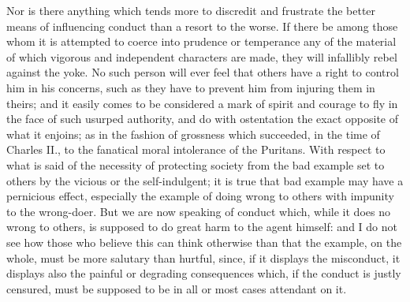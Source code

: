 \documentclass[11pt,openany]{book}
\begin{document}
Nor is there anything which tends more to discredit and frustrate the better means of influencing conduct than a resort to the worse. If there be among those whom it is attempted to coerce into prudence or temperance any of the material of which vigorous and independent characters are made, they will infallibly rebel against the yoke. No such person will ever feel that others have a right to control him in his concerns, such as they have to prevent him from injuring them in theirs; and it easily comes to be considered a mark of spirit and courage to fly in the face of such usurped authority, and do with ostentation the exact opposite of what it enjoins; as in the fashion of grossness which succeeded, in the time of Charles II., to the fanatical moral intolerance of the Puritans. With respect to what is said of the necessity of protecting society from the bad example set to others by the vicious or the self-indulgent; it is true that bad example may have a pernicious effect, especially the example of doing wrong to others with impunity to the wrong-doer. But we are now speaking of conduct which, while it does no wrong to others, is supposed to do great harm to the agent himself: and I do not see how those who believe this can think otherwise than that the example, on the whole, must be more salutary than hurtful, since, if it displays the misconduct, it displays also the painful or degrading consequences which, if the conduct is justly censured, must be supposed to be in all or most cases attendant on it.
\end{document}
